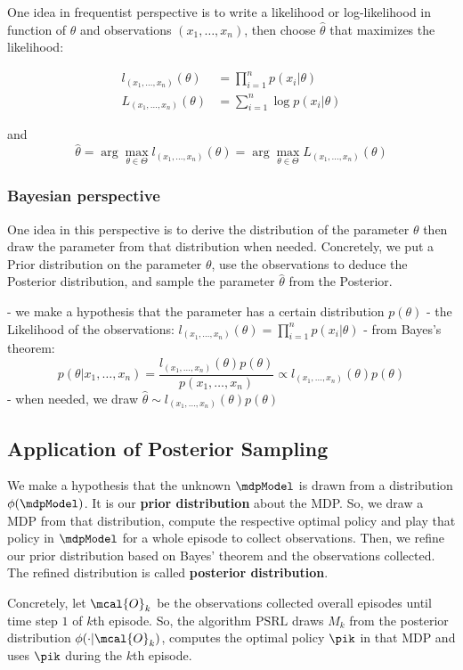 One idea in frequentist perspective is to write a likelihood or log-likelihood in function of $\theta$ and observations $(x_1,\dots,x_n)$, then choose $\hat{\theta}$ that maximizes the likelihood:

\begin{align*}
l_{(x_1,\dots,x_n)}(\theta)&=\prod_{i=1}^{n}p(x_i|\theta) \\
L_{(x_1,\dots,x_n)}(\theta)&=\sum_{i=1}^{n}\log p(x_i|\theta)
\end{align*}

and $$\hat{\theta}=\arg\max_{\theta\in\Theta}l_{(x_1,\dots,x_n)}(\theta)=\arg\max_{\theta\in\Theta}L_{(x_1,\dots,x_n)}(\theta)$$

\subsubsection{Bayesian perspective}
\label{subsubsec:bayes_perspective}

One idea in this perspective is to derive the distribution of the parameter $\theta$ then draw the parameter from that distribution when needed. Concretely, we put a Prior distribution on the parameter $\theta$, use the observations to deduce the Posterior distribution, and sample the parameter $\hat{\theta}$ from the Posterior.

- we make a hypothesis that the parameter has a certain distribution $p(\theta)$
- the Likelihood of the observations: $l_{(x_1,\dots,x_n)}(\theta)=\prod_{i=1}^{n}p(x_i|\theta)$
- from Bayes's theorem: $$p(\theta|x_1,\dots,x_n) =\frac{l_{(x_1,\dots,x_n)}(\theta)p(\theta)}{p(x_1,\dots,x_n)} \propto l_{(x_1,\dots,x_n)}(\theta)p(\theta)$$
- when needed, we draw $\hat{\theta}\sim l_{(x_1,\dots,x_n)}(\theta)p(\theta)$

\subsection{Application of Posterior Sampling}

We make a hypothesis that the unknown $\mdpModel$ is drawn from a distribution $\phi(\mdpModel)$. It is our \textbf{prior distribution} about the MDP. So, we draw a MDP from that distribution, compute the respective optimal policy and play that policy in $\mdpModel$ for a whole episode to collect observations. Then, we refine our prior distribution based on Bayes' theorem and the observations collected. The refined distribution is called \textbf{posterior distribution}.

Concretely, let $\mcal{O}_k$ be the observations collected overall episodes until time step $1$ of $k$th episode. So, the algorithm $\mathrm{PSRL}$ draws $M_k$ from the posterior distribution $\phi(\cdot|\mcal{O}_k)$, computes the optimal policy $\pik$ in that MDP and uses $\pik$ during the $k$th episode.

